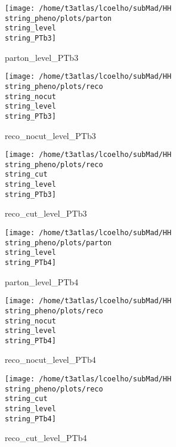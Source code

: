\documentclass[a4paper,onecolumn,final,11pt]{article}
\begin{document}
\begin{figure}[H] 
\centering 
\begin{minipage}{.32\textwidth} 
        \centering 
        \hspace{0cm} 
        \texttt{[image: /home/t3atlas/lcoelho/subMad/HH\\string\_pheno/plots/parton\\string\_level\\string\_PTb3]} 
        \caption{parton_level_PTb3} 
\end{minipage} 
\hfill 
\begin{minipage}{.32\textwidth} 
        \centering 
        \hspace{0cm} 
    \texttt{[image: /home/t3atlas/lcoelho/subMad/HH\\string\_pheno/plots/reco\\string\_nocut\\string\_level\\string\_PTb3]} 
        \caption{reco_nocut_level_PTb3} 
\end{minipage} 
\hfill 
\begin{minipage}{.32\textwidth} 
        \centering 
        \hspace{0cm} 
    \texttt{[image: /home/t3atlas/lcoelho/subMad/HH\\string\_pheno/plots/reco\\string\_cut\\string\_level\\string\_PTb3]} 
        \caption{reco_cut_level_PTb3} 
\end{minipage} 
\end{figure} 
 
\begin{figure}[H] 
\centering 
\begin{minipage}{.32\textwidth} 
        \centering 
        \hspace{0cm} 
        \texttt{[image: /home/t3atlas/lcoelho/subMad/HH\\string\_pheno/plots/parton\\string\_level\\string\_PTb4]} 
        \caption{parton_level_PTb4} 
\end{minipage} 
\hfill 
\begin{minipage}{.32\textwidth} 
        \centering 
        \hspace{0cm} 
    \texttt{[image: /home/t3atlas/lcoelho/subMad/HH\\string\_pheno/plots/reco\\string\_nocut\\string\_level\\string\_PTb4]} 
        \caption{reco_nocut_level_PTb4} 
\end{minipage} 
\hfill 
\begin{minipage}{.32\textwidth} 
        \centering 
        \hspace{0cm} 
    \texttt{[image: /home/t3atlas/lcoelho/subMad/HH\\string\_pheno/plots/reco\\string\_cut\\string\_level\\string\_PTb4]} 
        \caption{reco_cut_level_PTb4} 
\end{minipage} 
\end{figure} 
 
\end{document}
